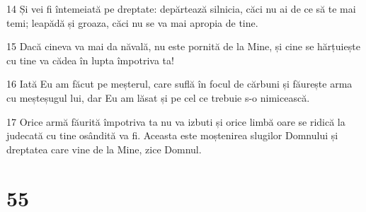 \par 14 Și vei fi întemeiată pe dreptate: depărtează silnicia, căci nu ai de ce să te mai temi; leapădă și groaza, căci nu se va mai apropia de tine.
\par 15 Dacă cineva va mai da năvală, nu este pornită de la Mine, și cine se hărțuiește cu tine va cădea în lupta împotriva ta!
\par 16 Iată Eu am făcut pe meșterul, care suflă în focul de cărbuni și făurește arma cu meșteșugul lui, dar Eu am lăsat și pe cel ce trebuie s-o nimicească.
\par 17 Orice armă făurită împotriva ta nu va izbuti și orice limbă oare se ridică la judecată cu tine osândită va fi. Aceasta este moștenirea slugilor Domnului și dreptatea care vine de la Mine, zice Domnul.

\chapter{55}

